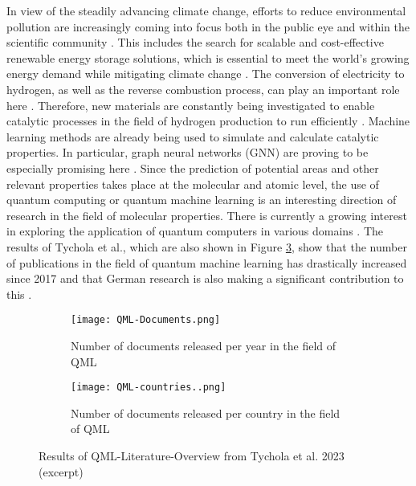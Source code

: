 In view of the steadily advancing climate change, efforts to reduce environmental pollution are
increasingly coming into focus both in the public eye and within the scientific community \cite{amin_hydrogen_2022}.
This includes the search for scalable and cost-effective renewable energy storage solutions, which
is essential to meet the world's growing energy demand while mitigating climate change \cite{kilkis_research_2019}. The
conversion of electricity to hydrogen, as well as the reverse combustion process, can play an
important role here \cite{amin_hydrogen_2022}. Therefore, new materials are constantly being investigated to enable
catalytic processes in the field of hydrogen production to run efficiently \cite{chen_waste-derived_2023}. Machine learning
methods are already being used to simulate and calculate catalytic properties. In particular, graph
neural networks (GNN) are proving to be especially promising here \cite{tran_open_2023, bronstein2017geometric}. Since the prediction of potential areas and other relevant properties takes place at the molecular and atomic level, the use of quantum computing or quantum machine learning is an interesting direction of research in the field of molecular properties. There is currently a growing interest in exploring the application of quantum computers in various domains \cite{valdez2023review}. The results of Tychola et al., which are also shown in Figure \ref{img:tychola}, show that the number of publications in the field of quantum machine learning has drastically increased since 2017 and that German research is also making a significant contribution to this \cite{Tychola_Kalampokas_Papakostas_2023}.

\begin{figure}[h!]
    \begin{subfigure}{.5\textwidth}
     \captionsetup{justification=centering}
      \centering
      \texttt{[image: QML-Documents.png]}
      \caption{Number of documents released per year in the field of QML}
      \label{fig:sfig1}
    \end{subfigure}%
    \begin{subfigure}{.5\textwidth}
      \centering
      \captionsetup{justification=centering}
      \texttt{[image: QML-countries..png]}
      \caption{Number of documents released per country in the field of QML}
      \label{fig:sfig2}
    \end{subfigure}
    \caption[Results of QML-Literature-Overview from Tychola et al. 2023 (excerpt)]{\label{img:tychola} Results of QML-Literature-Overview from Tychola et al. 2023 \cite{Tychola_Kalampokas_Papakostas_2023} (excerpt)}
    \end{figure}


